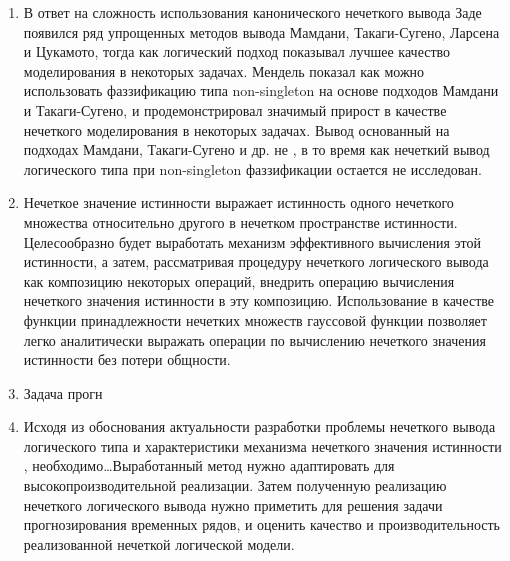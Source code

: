 \begin{enumerate}
	\item В ответ на сложность использования канонического нечеткого вывода Заде появился ряд упрощенных методов вывода Мамдани, Такаги-Сугено, Ларсена и Цукамото, тогда как логический подход показывал лучшее качество моделирования в некоторых задачах. Мендель показал как можно использовать фаззификацию типа non-singleton на основе подходов Мамдани и Такаги-Сугено, и продемонстрировал значимый прирост в качестве нечеткого моделирования в некоторых задачах. Вывод основанный на подходах Мамдани, Такаги-Сугено и др. не , в то время как нечеткий вывод логического типа при non-singleton фаззификации остается не исследован.
	\item Нечеткое значение истинности выражает истинность одного нечеткого множества относительно другого в нечетком пространстве истинности. Целесообразно будет выработать механизм эффективного вычисления этой истинности, а затем, рассматривая процедуру нечеткого логического вывода как композицию некоторых операций, внедрить операцию вычисления нечеткого значения истинности в эту композицию. Использование в качестве функции принадлежности нечетких множеств гауссовой функции позволяет легко аналитически выражать операции по вычислению нечеткого значения истинности без потери общности.
	\item Задача прогн
	\item Исходя из обоснования актуальности разработки проблемы нечеткого вывода логического типа и характеристики механизма нечеткого значения истинности , необходимо\dots Выработанный метод нужно адаптировать для высокопроизводительной реализации. Затем полученную реализацию нечеткого логического вывода нужно приметить для решения задачи прогнозирования временных рядов, и оценить качество и производительность реализованной нечеткой логической модели.
\end{enumerate}

\FloatBarrier
